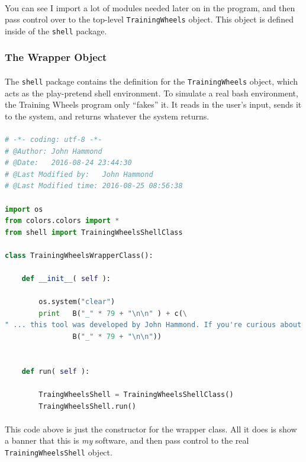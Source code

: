 \documentclass[11pt]{article}
\begin{document}
	\paragraph{} You can see I import a lot of modules needed later on in the program, and then
	pass control over to the top-level \texttt{TrainingWheels} object. This object is defined inside of the \texttt{shell} package.

	\subsubsection{The Wrapper Object}

	\paragraph{} The \texttt{shell} package contains the definition for the \texttt{TrainingWheels} object, which acts as the play-pretend shell environment. To simulate a real bash environment, the Training Wheels program only ``fakes'' it. It reads in the user's input, sends it to the system, and returns whatever the system returns.  

	\paragraph{}

	\begin{lstlisting}[language=Python]
# -*- coding: utf-8 -*-
# @Author: John Hammond
# @Date:   2016-08-24 23:44:30
# @Last Modified by:   John Hammond
# @Last Modified time: 2016-08-25 08:56:38

import os
from colors.colors import *
from shell import TrainingWheelsShellClass

class TrainingWheelsWrapperClass():

	def __init__( self ):
		
		os.system("clear")
		print 	B("_" * 79 + "\n\n" ) + c(\
" ... this tool was developed by John Hammond. If you're curious about it, ask!\n"+
			  	B("_" * 79 + "\n\n"))


	def run( self ):

		TraingWheelsShell = TrainingWheelsShellClass()
		TraingWheelsShell.run()
	\end{lstlisting}

	\paragraph{} This code above is just the constructor for the wrapper class. All it does is show a banner that this is \textit{my} software, and then pass control to the real \texttt{TrainingWheelsShell} object.
\end{document}
